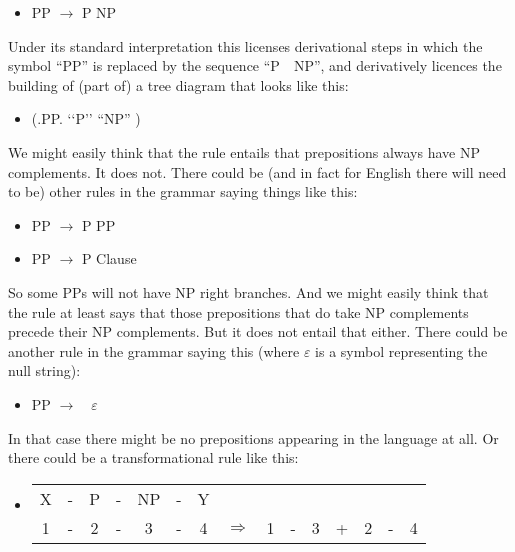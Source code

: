 \documentclass[output=paper]{langscibook}
\begin{document}
\begin{itemize} 
\item[]  PP \quad $\rightarrow$ \quad P \quad NP 
\end{itemize} 

Under its standard interpretation this licenses derivational steps in which the symbol ``PP'' is replaced by the sequence ``P~~NP'', and derivatively licences the building of (part of) a tree diagram that looks like this:

\begin{itemize} 
\item[] (.PP. `{`\rm P}'' ``{\rm NP}'' )
\end{itemize} 

We might easily think that the rule entails that prepositions always have NP complements. It does not. There could be (and in fact for English there will need to be) other rules in the grammar saying things like this:

\begin{itemize}
 \item[]  PP \quad $\rightarrow$ \quad P \quad PP 
 \item[]  PP \quad $\rightarrow$ \quad P \quad Clause 
\end{itemize} 

So some PPs will not have NP right branches. And we might easily think that the rule at least says that those prepositions that do take NP complements precede their NP complements. But it does not entail that either. There could be another rule in the grammar saying this (where $\varepsilon$ is a symbol representing the null string):

\begin{itemize} 
\item[]  PP \quad $\rightarrow \quad \varepsilon$ 
\end{itemize} 

In that case there might be no prepositions appearing in the language at all. Or there could be a transformational rule like this:

\begin{itemize} 
\item[]
\begin{tabular}[t]{ccccccccccccccc} X & - & P & - & NP & - & Y \\ 1 & - & 2 & - & 3  & - & 4 & $\Rightarrow$ & 1 & - & 3 & + & 2  & - & 4  
\end{tabular} 
\end{itemize} 
\end{document}
